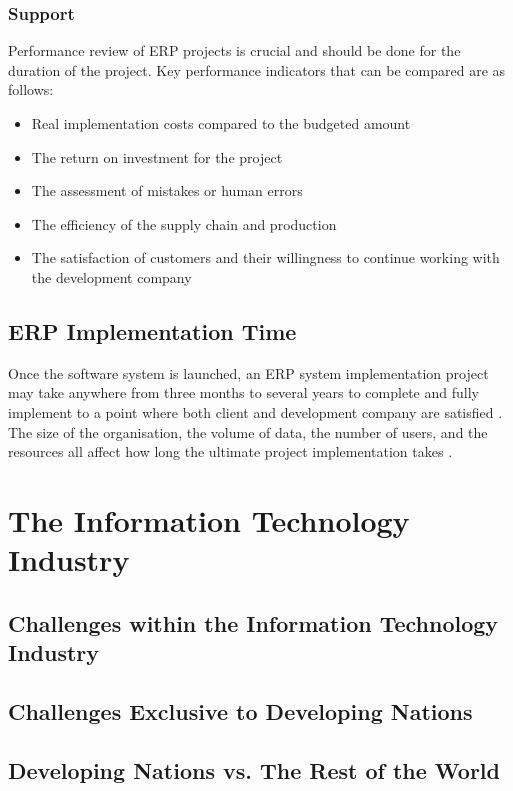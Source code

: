 \subsubsection{Support}
\par{Performance review of ERP projects is crucial and should be done for the duration of the project. Key performance indicators that can be compared are as follows:}
\begin{itemize}
    \item Real implementation costs compared to the budgeted amount
    \item The return on investment for the project
    \item The assessment of mistakes or human errors
    \item The efficiency of the supply chain and production
    \item The satisfaction of customers and their willingness to continue working with the development company
\end{itemize}
\subsection{ERP Implementation Time}
\par{Once the software system is launched, an ERP system implementation project may take anywhere from three months to several years to complete and fully implement to a point where both client and development company are satisfied \citep{sankar2006implementation}. The size of the organisation, the volume of data, the number of users, and the resources all affect how long the ultimate project implementation takes \citep{pelphrey2015directing}.}

\section{The Information Technology Industry}
\subsection{Challenges within the Information Technology Industry}
\subsection{Challenges Exclusive to Developing Nations}
\subsection{Developing Nations vs. The Rest of the World}

